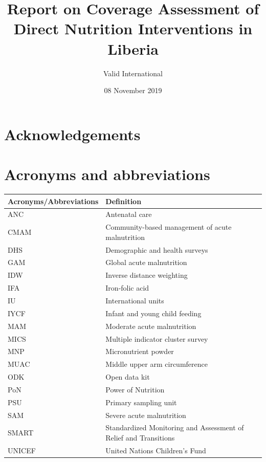 \documentclass[12pt,a4paper]{article}
\title{\vspace{3.5in}Report on Coverage Assessment of Direct Nutrition Interventions in Liberia}
\author{Valid International}
\date{08 November 2019}
\begin{document}
\maketitle

\newpage 


{
\hypersetup{linkcolor=black}
\setcounter{tocdepth}{3}
\tableofcontents
}
\listoftables
\listoffigures
\newpage

\hypertarget{acknowledgements}{%
\section*{Acknowledgements}\label{acknowledgements}}

\newpage

\hypertarget{acronyms-and-abbreviations}{%
\section*{Acronyms and abbreviations}\label{acronyms-and-abbreviations}}

\begin{longtable}{ll}
\toprule
\textbf{Acronyms/Abbreviations} & \textbf{Definition}\\
\midrule
ANC & Antenatal care\\
CMAM & Community-based management of acute malnutrition\\
DHS & Demographic and health surveys\\
GAM & Global acute malnutrition\\
IDW & Inverse distance weighting\\
\addlinespace
IFA & Iron-folic acid\\
IU & International units\\
IYCF & Infant and young child feeding\\
MAM & Moderate acute malnutrition\\
MICS & Multiple indicator cluster survey\\
\addlinespace
MNP & Micronutrient powder\\
MUAC & Middle upper arm circumference\\
ODK & Open data kit\\
PoN & Power of Nutrition\\
PSU & Primary sampling unit\\
\addlinespace
SAM & Severe acute malnutrition\\
SMART & Standardized Monitoring and Assessment of Relief and Transitions\\
UNICEF & United Nations Children's Fund\\
\bottomrule
\end{longtable}
\end{document}

